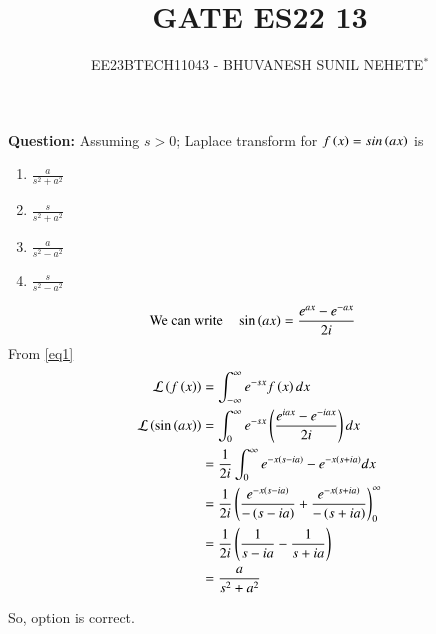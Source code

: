 \documentclass[journal,12pt,twocolumn]{IEEEtran}
\theoremstyle{remark}
\begin{document}

\vspace{3cm}

\title{GATE ES22 13}
\author{EE23BTECH11043 - BHUVANESH SUNIL NEHETE$^{*}$%
}
\maketitle
\newpage
\bigskip

\renewcommand{\thefigure}{\theenumi}
\renewcommand{\thetable}{\theenumi}



\textbf{Question:}
Assuming $s>0$; Laplace transform for $f\left(x\right) = sin\left(ax\right)$ is
\begin{enumerate}[label=(\Alph*)]
    \item $\frac{a}{s^2+a^2}$
    \item $\frac{s}{s^2+a^2}$
    \item $\frac{a}{s^2-a^2}$
    \item $\frac{s}{s^2-a^2}$
\end{enumerate}

\solution

\begin{align}
\text{We can write} \quad\sin\left(ax\right)&=\frac{e^{ax}-e^{-ax}}{2i}\label{eq1}
\end{align}
From \eqref{eq1}
\begin{align}
\mathcal{L}\left(f\left(x\right)\right)&=\int_{-\infty}^{\infty}e^{-sx}f\left(x\right)dx\\
\mathcal{L}\left(\sin\left(ax\right)\right)&=\int_{0}^{\infty}e^{-sx}\left(\frac{e^{iax}-e^{-iax}}{2i}\right)dx\\
&=\frac{1}{2i}\int_{0}^{\infty}e^{-x\left(s-ia\right)}-e^{-x\left(s+ia\right)}dx\\
&=\frac{1}{2i}\left(\frac{e^{-x\left(s-ia\right)}}{-\left(s-ia\right)}+\frac{e^{-x\left(s+ia\right)}}{-\left(s+ia\right)}\right)_{0}^{\infty}\\
&=\frac{1}{2i}\left(\frac{1}{s-ia}-\frac{1}{s+ia}\right)\\
&=\frac{a}{s^2+a^2}
\end{align}

So, option  is correct.
 
\end{document}
